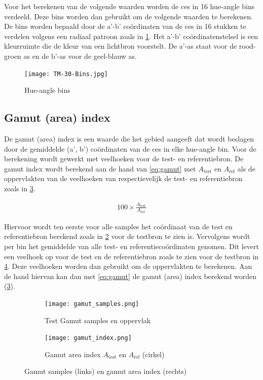 Voor het berekenen van de volgende waarden worden de \gls{ces} in 16 hue-angle bins verdeeld. Deze bins worden dan gebruikt om de volgende waarden te berekenen. De bins worden bepaald door de a'-b' co\"ordinaten van de \gls{ces} in 16 stukken te verdelen volgens een radiaal patroon zoals in \cref{fig:huebins}. Het a'-b' co\"ordinatenstelsel is een kleurruimte die de kleur van een lichtbron voorstelt. De a'-as staat voor de rood-groen as en de b'-as voor de geel-blauw as.

\begin{figure}[H]
    \centering
    \texttt{[image: TM-30-Bins.jpg]}
    \caption{Hue-angle bins}%
    \label{fig:huebins}
\end{figure}

\subsection{Gamut (area) index}

De gamut (area) index is een waarde die het gebied aangeeft dat wordt beslagen door de gemiddelde (a', b') co\"ordinaten van de \gls{ces} in elke hue-angle bin. Voor de berekening wordt gewerkt met veelhoeken voor de test- en referentiebron. De gamut index wordt berekend aan de hand van \cref{eq:gamut} met $A_{\text{test}}$ en $A_{\text{ref}}$ als de oppervlakten van de veelhoeken van respectievelijk de test- en referentiebron zoals in \cref{fig:gamut}. ~\cite{david2018,simsWhatGamutArea2022}

\begin{align}
    100 \times \frac{A_{\text{test}}}{A_{\text{ref}}} \label{eq:gamut}
\end{align}

Hiervoor wordt ten eerste voor alle samples het co\"ordinaat van de test en referentiebron berekend zoals in \cref{fig:gamut_samples} voor de testbron te zien is. Vervolgens wordt per bin het gemiddelde van alle test- en referentieco\"ordinaten genomen. Dit levert een veelhoek op voor de test en de referentiebron zoals te zien voor de testbron in \cref{fig:gamut_combined}. Deze veelhoeken worden dan gebruikt om de oppervlakten te berekenen. Aan de hand hiervan kan dan met \cref{eq:gamut} de gamut (area) index berekend worden (\cref{fig:gamut}).

\begin{figure}[H]
    \centering
    \begin{subfigure}[b]{0.45\linewidth}
        \centering
        \texttt{[image: gamut\_samples.png]}
        \caption{Test Gamut samples en oppervlak}%
        \label{fig:gamut_samples}
    \end{subfigure}
    \hfill
    \begin{subfigure}[b]{0.45\linewidth}
        \centering
        \texttt{[image: gamut\_index.png]}
        \caption{Gamut area index $A_{\text{test}}$ en $A_{\text{ref}}$ (cirkel)}%
        \label{fig:gamut}
    \end{subfigure}
    \caption{Gamut samples (links) en gamut area index (rechts)}%
    \label{fig:gamut_combined}
\end{figure}

